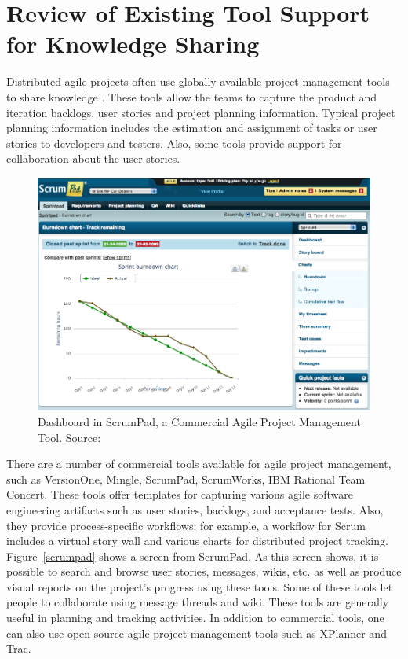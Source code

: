 \section{Review of Existing Tool Support for Knowledge Sharing}
Distributed agile projects often use globally available project management tools to share knowledge \cite{essential_communication}. These tools allow the teams to capture the product and iteration backlogs, user stories and project planning information. Typical project planning information includes the estimation and assignment of tasks or user stories to developers and testers. Also, some tools provide support for collaboration about the user stories.

\begin{figure}[bt]
	\centering
	\includegraphics[width=\textwidth]{Scrumpad.png}
    \caption{Dashboard in ScrumPad, a Commercial Agile Project Management Tool. Source: \cite{scrum_pad}}
	\label{fig:scrumpad}
\end{figure}


There are a number of commercial tools available for agile project management, such as VersionOne\cite{version_one}, Mingle\cite{mingle}, ScrumPad\cite{scrum_pad}, ScrumWorks\cite{scrum_works}, IBM Rational Team Concert\cite{ibm_rtc}. These tools offer templates for capturing various agile software engineering artifacts such as user stories, backlogs, and acceptance tests. Also, they provide process-specific workflows; for example, a workflow for Scrum includes a virtual story wall and various charts for distributed project tracking. Figure~\ref{scrumpad} shows a screen from ScrumPad. As this screen shows, it is possible to search and browse user stories, messages, wikis, etc. as well as produce visual reports on the project's progress using these tools. Some of these tools let people to collaborate using message threads and wiki. These tools are generally useful in planning and tracking activities. In addition to commercial tools, one can also use open-source agile project management tools such as XPlanner\cite{xplanner} and Trac\cite{trac}.

